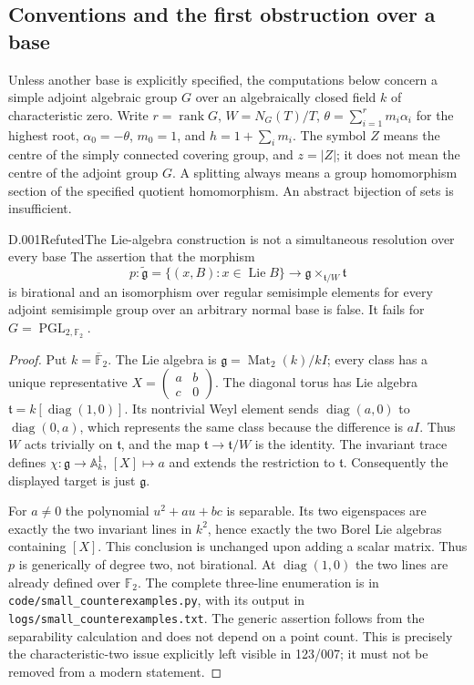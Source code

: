 \label{partD}

\subsection{Conventions and the first obstruction over a base}
Unless another base is explicitly specified, the computations below concern a
simple adjoint algebraic group $G$ over an algebraically closed field $k$ of
characteristic zero.  Write $r=\operatorname{rank}G$, $W=N_G(T)/T$,
$\theta=\sum_{i=1}^r m_i\alpha_i$ for the highest root, $\alpha_0=-\theta$,
$m_0=1$, and $h=1+\sum_i m_i$.  The symbol $Z$ means the centre of the
simply connected covering group, and $z=|Z|$; it does not mean the centre
of the adjoint group $G$.  A splitting always means a group homomorphism
section of the specified quotient homomorphism.  An abstract bijection of
sets is insufficient.

\begin{saresult}{D.001}{Refuted}{The Lie-algebra construction is not a simultaneous resolution over every base}
The assertion that the morphism
\[
 p:\widetilde{\mathfrak g}=\{(x,B):x\in\operatorname{Lie}B\}
 \longrightarrow \mathfrak g\times_{\mathfrak t/W}\mathfrak t
\]
is birational and an isomorphism over regular semisimple elements for every
adjoint semisimple group over an arbitrary normal base is false.  It fails
for $G=\operatorname{PGL}_{2,\mathbb F_2}$.
\end{saresult}
\begin{proof}
Put $k=\overline{\mathbb F}_2$.  The Lie algebra is
$\mathfrak g=\operatorname{Mat}_2(k)/kI$; every class has a unique
representative $X=\left(\begin{smallmatrix}a&b\\c&0\end{smallmatrix}\right)$.
The diagonal torus has Lie algebra $\mathfrak t=k[\operatorname{diag}(1,0)]$.
Its nontrivial Weyl element sends $\operatorname{diag}(a,0)$ to
$\operatorname{diag}(0,a)$, which represents the same class because the
difference is $aI$.  Thus $W$ acts trivially on $\mathfrak t$, and the map
$\mathfrak t\to\mathfrak t/W$ is the identity.  The invariant trace
defines $\chi:\mathfrak g\to\mathbb A^1_k$, $[X]\mapsto a$ and extends
the restriction to $\mathfrak t$.  Consequently the displayed target is
just $\mathfrak g$.

For $a\ne0$ the polynomial $u^2+au+bc$ is separable.  Its two eigenspaces
are exactly the two invariant lines in $k^2$, hence exactly the two Borel
Lie algebras containing $[X]$.  This conclusion is unchanged upon adding a
scalar matrix.  Thus $p$ is generically of degree two, not birational.
At $\operatorname{diag}(1,0)$ the two lines are already defined over
$\mathbb F_2$.  The complete three-line enumeration is in
\texttt{code/small\_counterexamples.py}, with its output in
\texttt{logs/small\_counterexamples.txt}.  The generic assertion follows
from the separability calculation and does not depend on a point count.
This is precisely the characteristic-two issue explicitly left visible
in 123/007; it must not be removed from a modern statement.
\end{proof}

